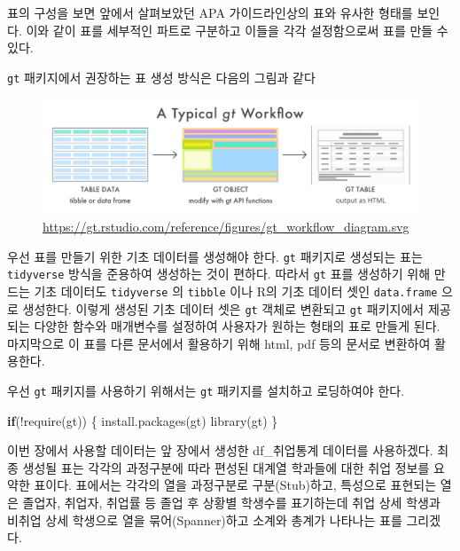 \documentclass[
]{article}
\newenvironment{Shaded}{\begin{snugshade}}{\end{snugshade}}
\newcommand{\ControlFlowTok}[1]{\textcolor[rgb]{0.13,0.29,0.53}{\textbf{#1}}}
\newcommand{\FunctionTok}[1]{\textcolor[rgb]{0.00,0.00,0.00}{#1}}
\newcommand{\NormalTok}[1]{#1}
\newcommand{\SpecialCharTok}[1]{\textcolor[rgb]{0.00,0.00,0.00}{#1}}
\newcommand{\StringTok}[1]{\textcolor[rgb]{0.31,0.60,0.02}{#1}}
\begin{document}
표의 구성을 보면 앞에서 살펴보았던 APA 가이드라인상의 표와 유사한 형태를
보인다. 이와 같이 표를 세부적인 파트로 구분하고 이들을 각각 설정함으로써
표를 만들 수 있다.

\texttt{gt} 패키지에서 권장하는 표 생성 방식은 다음의 그림과 같다

\begin{figure}
\centering
\includegraphics{gt_workflow_diagram.svg}
\caption{\url{https://gt.rstudio.com/reference/figures/gt_workflow_diagram.svg}}
\end{figure}

우선 표를 만들기 위한 기초 데이터를 생성해야 한다. \texttt{gt} 패키지로
생성되는 표는 \texttt{tidyverse} 방식을 준용하여 생성하는 것이 편하다.
따라서 \texttt{gt} 표를 생성하기 위해 만드는 기초 데이터도
\texttt{tidyverse} 의 \texttt{tibble} 이나 R의 기초 데이터 셋인
\texttt{data.frame} 으로 생성한다. 이렇게 생성된 기초 데이터 셋은
\texttt{gt} 객체로 변환되고 \texttt{gt} 패키지에서 제공되는 다양한
함수와 매개변수를 설정하여 사용자가 원하는 형태의 표로 만들게 된다.
마지막으로 이 표를 다른 문서에서 활용하기 위해 html, pdf 등의 문서로
변환하여 활용한다.

우선 \texttt{gt} 패키지를 사용하기 위해서는 \texttt{gt} 패키지를
설치하고 로딩하여야 한다.

\begin{Shaded}
\begin{Highlighting}[]
\ControlFlowTok{if}\NormalTok{(}\SpecialCharTok{!}\FunctionTok{require}\NormalTok{(}\StringTok{\textquotesingle{}gt\textquotesingle{}}\NormalTok{)) \{}
  \FunctionTok{install.packages}\NormalTok{(}\StringTok{\textquotesingle{}gt\textquotesingle{}}\NormalTok{)}
  \FunctionTok{library}\NormalTok{(gt)}
\NormalTok{\}}
\end{Highlighting}
\end{Shaded}

이번 장에서 사용할 데이터는 앞 장에서 생성한 df\_취업통계 데이터를
사용하겠다. 최종 생성될 표는 각각의 과정구분에 따라 편성된 대계열
학과들에 대한 취업 정보를 요약한 표이다. 표에서는 각각의 열을 과정구분로
구분(Stub)하고, 특성으로 표현되는 열은 졸업자, 취업자, 취업률 등 졸업 후
상황별 학생수를 표기하는데 취업 상세 학생과 비취업 상세 학생으로 열을
묶어(Spanner)하고 소계와 총계가 나타나는 표를 그리겠다.
\end{document}

